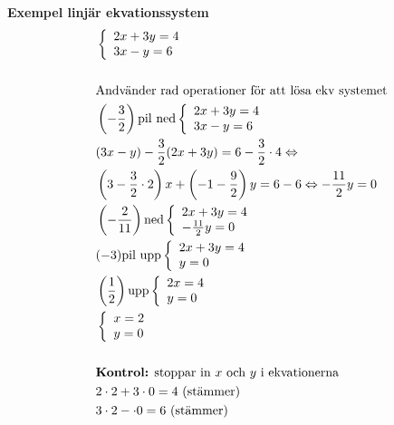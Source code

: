 \textbf{Exempel linjär ekvationssystem}
\begin{align*}
  &\quad  \left\{\begin{array}{l}
  2x+3y=4 \\
  3x-y=6
  \end{array}\right. \\
  &\quad \\
  &\quad  \text{Andvänder rad operationer för att lösa ekv systemet} \\
  &\quad  \left(-\frac{3}{2}\right) \text{pil ned} \left\{\begin{array}{l}
  2x+3y=4 \\
  3x-y=6
  \end{array}\right. \\
  &\quad
  (3x-y) -\frac{3}{2} (2x+3y)=6 -\frac{3}{2} \cdot 4 \Leftrightarrow{} \\
  &\quad
  \left(3-\frac{3}{2}\cdot 2\right) x + \left(-1 -\frac{9}{2}\right) y = 6 -6
  \Leftrightarrow-\frac{11}{2}y = 0 \\
  &\quad  \left(-\frac{2}{11}\right) \text{ned} \left\{\begin{array}{l}
  2x+3y=4 \\
  -\frac{11}{2}y = 0
  \end{array}\right. \\
  &\quad  (-3)\text{pil upp}\left\{\begin{array}{l}
  2x+3y=4 \\
  y=0
  \end{array}\right. \\
  &\quad  \left(\frac{1}{2}\right)\text{upp}\left\{\begin{array}{l}
  2x=4 \\
  y=0
  \end{array}\right. \\
  &\quad  \left\{\begin{array}{l}
  x=2 \\
  y=0
  \end{array}\right. \\
  &\quad \\
  &\quad  \text{\textbf{Kontrol:} stoppar in $x$ och $y$ i ekvationerna} \\
  &\quad  2\cdot{2}+3\cdot{0}=4 \text{ (stämmer)} \\
  &\quad  3\cdot{2}-\cdot{0}=6 \text{ (stämmer)} \\
\end{align*}


